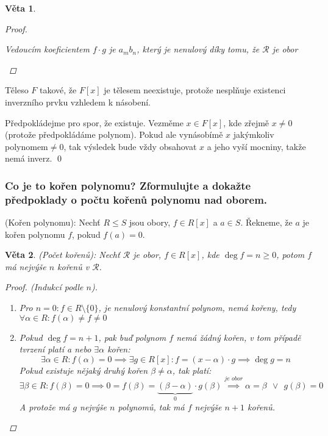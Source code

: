 \documentclass[10pt,a4paper]{article}
\newtheorem{veta}{Věta}
\begin{document}
\begin{veta}
\begin{proof}
\begin{enumerate}[label=(\roman*)]
            Vedoucím koeficientem $f\cdot g$ je $a_m b_n$,  který je nenulový díky tomu, že $\mathcal{R}$ je obor
        \end{enumerate}
    \end{proof}
\end{veta}

Těleso $F$ takové, že $F[x]$ je tělesem neexistuje, protože nesplňuje existenci inverzního prvku vzhledem k násobení.

Předpokládejme pro spor, že existuje. Vezměme $x\in F[x]$, kde zřejmě $x\neq 0$ (protože předpokládáme polynom).
Pokud ale vynásobímě $x$ jakýmkoliv polynomem$\neq 0$, tak výsledek bude vždy obsahovat $x$ a jeho vyší mocniny, takže nemá inverz.
\qed

\subsubsection{Co je to kořen polynomu? Zformulujte a dokažte předpoklady o počtu kořenů polynomu nad oborem.}

 (Kořen polynomu): \normalfont  Nechť $R \leq S$ jsou obory, $f \in R[x]$ a $a \in S$. Řekneme, že $a$ je kořen polynomu $f$, pokud $f(a) = 0$.

\begin{veta} (Počet kořenů): \normalfont 
    Nechť $\mathcal{R}$ je obor, $f\in R[x]$, kde $\deg f  = n \geq 0$, potom $f$ má nejvýše $n$ kořenů v $\mathcal{R}$.

    \begin{proof} \textit{(Indukcí podle $n$)}.
        \begin{enumerate}[label=(\roman*)]
            \item Pro $n = 0: f\in R\setminus\{0\}$, je nenulový konstantní polynom, nemá kořeny, tedy $\forall \alpha \in R: f(\alpha)\neq f \neq 0$
            \item Pokud $\deg f = n + 1$, pak buď polynom $f$ nemá žádný kořen, v tom případě tvrzení platí a nebo $\exists \alpha$ kořen:
            $$\exists \alpha\in R: f(\alpha) = 0 \implies \exists g \in R[x]: f = (x-\alpha)\cdot g  \implies \deg g = n$$
            Pokud existuje nějaký druhý kořen $\beta \neq \alpha$, tak platí:
            $$\exists \beta \in R: f(\beta) = 0 \implies 0 = f(\beta) = \underbrace{(\beta - \alpha)}_{0}\cdot g(\beta) \stackrel{\textit{je obor}}{\implies} \alpha = \beta ~~\lor~~ g(\beta) = 0$$
            A protože má $g$ nejvýše $n$ polynomů, tak má $f$ nejvýše $n+1$ kořenů.
        \end{enumerate}
    \end{proof}
\end{veta}
\end{document}
